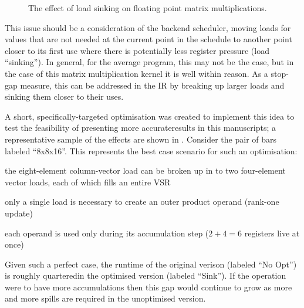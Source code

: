 \documentclass[\main/thesis.tex]{subfiles}
\begin{document}
\begin{figure}
  \centering
  
  \caption{The effect of load sinking on floating point matrix multiplications.}
  \label{fig:floatSink}
\end{figure}

This issue should be a consideration of the backend scheduler\footnotemark, moving loads for values that are not needed at the current \gls{point} in the schedule to another \gls{point} closer to its first use where there is potentially less register pressure (load ``sinking'').
In general, for the average program, this may not be the case, but in the case of this matrix multiplication kernel it is well within reason.
As a stop-gap measure, this can be addressed in the IR by breaking up larger loads and sinking them closer to their uses.

A short, specifically-targeted optimisation was created to implement this idea to test the feasibility of presenting more accurate\footnotemark results in this manuscripts; a representative sample of the effects are shown in .
Consider the pair of bars labeled ``8x8x16''.
This represents the best case scenario for such an optimisation:
\begin{enumerate*}[itemjoin={{; }}, itemjoin*={{; and }}, label=\textbf{(\arabic*)}, after={.}]
  \item the eight-element column-vector load can be broken up in to two four-element vector loads, each of which fills an entire VSR
  \item only a single load is necessary to create an outer product operand (rank-one update)
  \item each operand is used only during its accumulation step ($2+4=6$ registers \gls{live} at once)
\end{enumerate*}
Given such a perfect case, the runtime of the original verison (labeled ``No Opt'') is roughly quartered\footnotemark in the optimised version (labeled ``Sink'').
If the operation were to have more accumulations then this gap would continue to grow as more and more spills are required in the unoptimised version.
\end{document}
